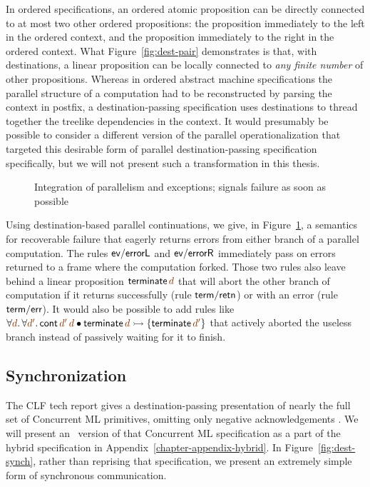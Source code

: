 In ordered specifications, an ordered atomic proposition can be
directly connected to at most two other ordered propositions: the
proposition immediately to the left in the ordered context, and the
proposition immediately to the right in the ordered context. What
Figure~\ref{fig:dest-pair} demonstrates is that, with destinations, a
linear proposition can be locally connected to {\it any finite number}
of other propositions. Whereas in ordered abstract machine
specifications the parallel structure of a computation had to be
reconstructed by parsing the context in postfix, a
destination-passing specification uses destinations to thread together
the treelike dependencies in the context. It would presumably be
possible to consider a different version of the parallel
operationalization that targeted this desirable form of 
parallel destination-passing
specification specifically, but we will not present such a
transformation in this thesis. 

\begin{figure}
\caption{Integration of parallelism and exceptions; signals failure as
  soon as possible}
\label{fig:dest-fail-paror}
\end{figure}

Using destination-based parallel continuations, we give, in
Figure~\ref{fig:dest-fail-paror}, a semantics for recoverable failure
that eagerly returns errors from either branch of a parallel
computation. The rules ${\sf ev/errorL}$ and ${\sf ev/errorR}$
immediately pass on errors returned to a frame where the computation
forked.  Those two rules also leave behind a linear proposition ${\sf
  terminate}\,\lf{d}$ that will abort the other branch of computation if it
returns successfully (rule ${\sf term/retn}$) or with an error (rule
${\sf term/err}$). It would also be possible to add rules
like $\forall \lf{d}.\,\forall\lf{d'}.\,{\sf cont}\,\lf{d'}\,\lf{d} \fuse {\sf terminate}\,\lf{d} \lefti \{ {\sf
  terminate}\,\lf{d'} \}$ that actively aborted the useless branch instead
of passively waiting for it to finish.

\subsection{Synchronization}
\label{sec:dest-synch}

The CLF tech report gives a destination-passing presentation of
nearly the full set of Concurrent ML primitives, omitting only
negative acknowledgements \cite{cervesato02concurrent}. We will
present an \sls~version of that Concurrent ML specification as a part
of the hybrid specification in Appendix~\ref{chapter-appendix-hybrid}.
In Figure~\ref{fig:dest-synch}, rather than reprising that
specification, we present an extremely simple form of synchronous
communication.


